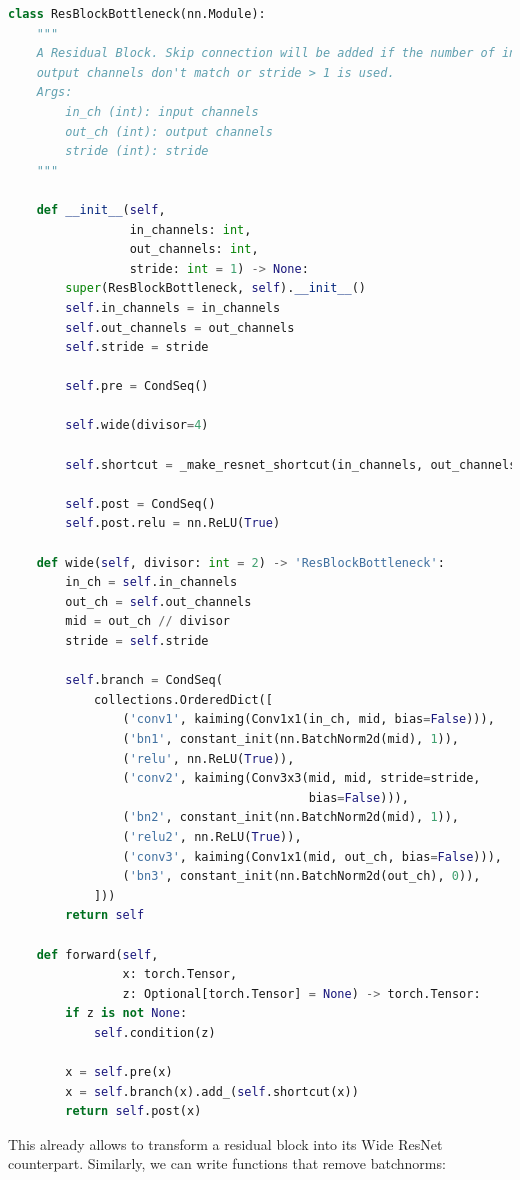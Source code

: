 \begin{lstlisting}[language=Python, caption=A ResBlock in Torchelie]
class ResBlockBottleneck(nn.Module):
    """
    A Residual Block. Skip connection will be added if the number of input and
    output channels don't match or stride > 1 is used.
    Args:
        in_ch (int): input channels
        out_ch (int): output channels
        stride (int): stride
    """

    def __init__(self,
                 in_channels: int,
                 out_channels: int,
                 stride: int = 1) -> None:
        super(ResBlockBottleneck, self).__init__()
        self.in_channels = in_channels
        self.out_channels = out_channels
        self.stride = stride

        self.pre = CondSeq()

        self.wide(divisor=4)

        self.shortcut = _make_resnet_shortcut(in_channels, out_channels, stride)

        self.post = CondSeq()
        self.post.relu = nn.ReLU(True)

    def wide(self, divisor: int = 2) -> 'ResBlockBottleneck':
        in_ch = self.in_channels
        out_ch = self.out_channels
        mid = out_ch // divisor
        stride = self.stride

        self.branch = CondSeq(
            collections.OrderedDict([
                ('conv1', kaiming(Conv1x1(in_ch, mid, bias=False))),
                ('bn1', constant_init(nn.BatchNorm2d(mid), 1)),
                ('relu', nn.ReLU(True)),
                ('conv2', kaiming(Conv3x3(mid, mid, stride=stride,
                                          bias=False))),
                ('bn2', constant_init(nn.BatchNorm2d(mid), 1)),
                ('relu2', nn.ReLU(True)),
                ('conv3', kaiming(Conv1x1(mid, out_ch, bias=False))),
                ('bn3', constant_init(nn.BatchNorm2d(out_ch), 0)),
            ]))
        return self

    def forward(self,
                x: torch.Tensor,
                z: Optional[torch.Tensor] = None) -> torch.Tensor:
        if z is not None:
            self.condition(z)

        x = self.pre(x)
        x = self.branch(x).add_(self.shortcut(x))
        return self.post(x)
\end{lstlisting}

This already allows to transform a residual block into its Wide ResNet \cite{wrn} counterpart. Similarly, we can write functions that remove batchnorms:


